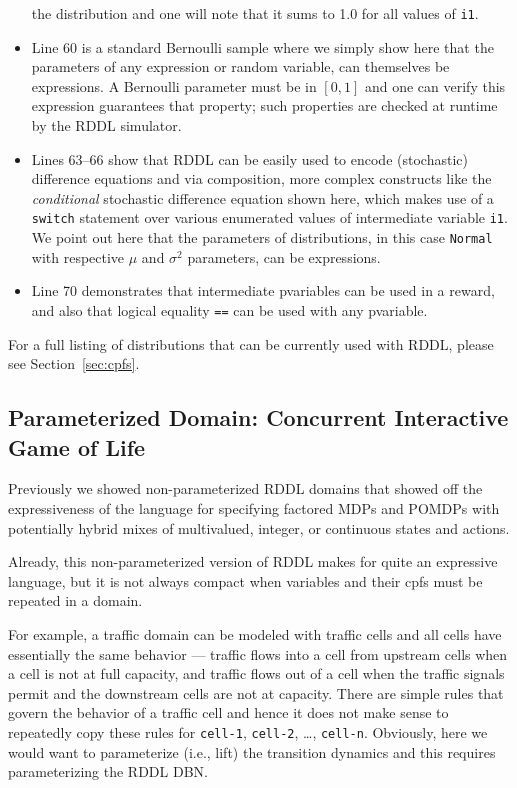 \documentclass[11pt,a4paper]{article}
\begin{document}
\begin{itemize}
the distribution and one will note that it sums to 1.0 for all values
of \texttt{i1}.
\item Line 60 is a standard Bernoulli sample where we simply show here
that the parameters of any expression or random variable, can themselves
be expressions.  A Bernoulli parameter must be in $[0,1]$ and one can
verify this expression guarantees that property; such properties are
checked at runtime by the RDDL simulator.
\item Lines 63--66 show that RDDL can be easily used to encode
(stochastic) difference equations and via composition, more complex
constructs like the \emph{conditional} stochastic difference equation
shown here, which makes use of a \texttt{switch} statement over
various enumerated values of intermediate variable \texttt{i1}.
We point out here that the parameters of distributions, in this case
\texttt{Normal} with respective $\mu$ and $\sigma^2$ parameters, can
be expressions.
\item Line 70 demonstrates that intermediate pvariables can be used in a
reward, and also that logical equality \texttt{==} can be used with 
any pvariable.%
\end{itemize}
For a full listing of distributions that can be currently used with
RDDL, please see Section~\ref{sec:cpfs}.

\subsection{Parameterized Domain: Concurrent Interactive Game of Life}

Previously we showed non-parameterized RDDL domains that showed off
the expressiveness of the language for specifying factored MDPs and
POMDPs with potentially hybrid mixes of multivalued, integer, or
continuous states and actions.

Already, this non-parameterized version of RDDL makes for quite an 
expressive language, but it is not always compact when variables
and their cpfs must be repeated in a domain.

For example, a traffic domain can be modeled with traffic cells and
all cells have essentially the same behavior --- traffic flows into a
cell from upstream cells when a cell is not at full capacity, and
traffic flows out of a cell when the traffic signals permit and the
downstream cells are not at capacity.  There are simple rules that
govern the behavior of a traffic cell and hence it does not make sense
to repeatedly copy these rules for \texttt{cell-1}, \texttt{cell-2},
\ldots, \texttt{cell-n}.  Obviously, here we would want to
parameterize (i.e., lift) the transition dynamics and this 
requires parameterizing the RDDL DBN.
\end{document}
